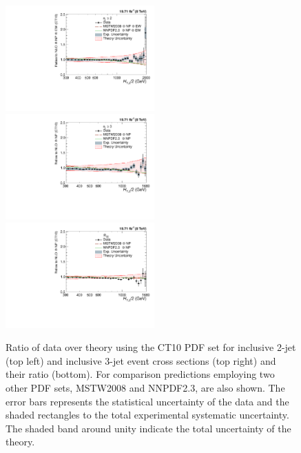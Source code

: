 \begin{figure}[!h]
 \begin{center}
 \hspace*{-5mm}\includegraphics[width=0.51\textwidth]{Plots_HT_2_150/Comparison_data_NLO_Pdfs_2_EW.pdf}%
 ~~\includegraphics[width=0.51\textwidth]{Plots_HT_2_150/Comparison_data_NLO_Pdfs_3.pdf}\\
 \includegraphics[width=0.51\textwidth]{Plots_HT_2_150/Comparison_data_NLO_Pdfs_ratio_32.pdf}\\  
 \caption{Ratio of data over theory using the CT10 PDF set for inclusive 2-jet (top left) and inclusive 3-jet event cross sections (top right) and their ratio \ratio (bottom). For comparison predictions employing two other PDF sets, MSTW2008 and NNPDF2.3, are also shown. The error bars represents the statistical uncertainty of the data and the shaded rectangles to the total experimental systematic uncertainty. The shaded band around unity indicate the total uncertainty of the theory.}
 \label{fig:data_NLOPdfs}
 \end{center}  
\end{figure}

